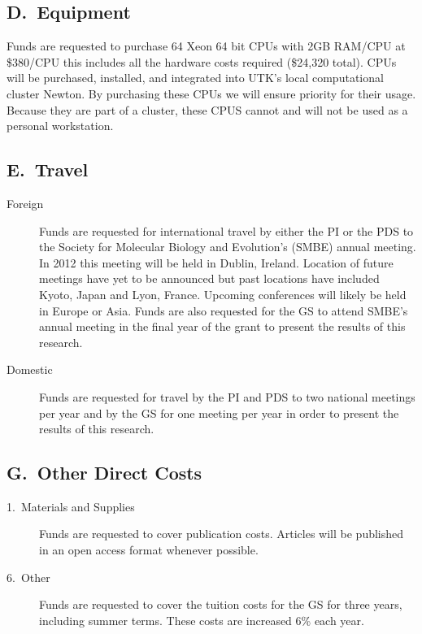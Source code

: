 \documentclass[11pt,fleqn]{article}
\begin{document}
\subsection*{D.~Equipment}
Funds are requested to purchase 64 Xeon 64 bit CPUs with 2GB RAM/CPU at \$380/CPU this includes all the hardware costs required (\$24,320 total).
CPUs will be purchased, installed, and integrated into UTK's local computational cluster Newton.
By purchasing these CPUs we will ensure priority for their usage.
Because they are part of a cluster, these CPUS cannot and will not be used as a personal workstation.



\subsection*{E.~Travel}
\begin{description}
\item[Foreign] Funds are requested for international travel by either the PI or the PDS  to the Society for Molecular Biology and Evolution's (SMBE) annual meeting.
In 2012 this meeting will be held in Dublin, Ireland.  Location of future meetings have yet to be announced but past locations have included Kyoto, Japan and Lyon, France. 
Upcoming conferences will likely be held in Europe or Asia.
Funds are also requested for the GS to attend SMBE's annual meeting in the final year of the grant to present the results of this research.

\item[Domestic] Funds are requested for travel by the PI and PDS  to two national meetings per year and by the GS for one meeting per year in order  to present the results of this research.
\end{description}

\subsection*{G.~Other Direct Costs}
\begin{description}
\item[1.~Materials and Supplies] Funds are requested to cover publication costs.
Articles will be published in an open access format whenever possible.

\item[6.~Other] Funds are requested to cover the tuition costs for the GS for three years, including summer terms.
These costs are increased 6\% each year.
\end{description}
\end{document}
